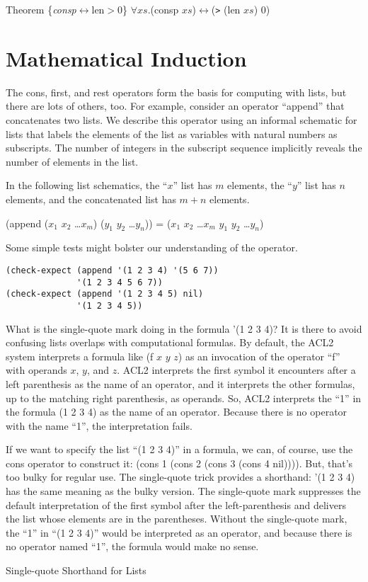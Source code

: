 \label{consp-len-thm}
Theorem \{\emph{consp}$\leftrightarrow$len$>$0\} $\forall xs.$(consp $xs$)$\leftrightarrow$(\verb+>+ (len $xs$) 0)

\section{Mathematical Induction}
\label{sec:induction}
The cons, first, and rest operators form the basis for computing with lists, but there are lots of others, too. For example, consider an operator ``append'' that concatenates two lists. We describe this operator using an informal schematic for lists that labels the elements of the list as variables with natural numbers as subscripts. The number of integers in the subscript sequence implicitly reveals the number of elements in the list.

\label{list-schematic} In the following list schematics, the ``$x$'' list has $m$ elements, the ``$y$'' list has $n$ elements, and the concatenated list has $m+n$ elements.
\begin{center}
(append ($x_1$ $x_2$ \dots $x_m$) ($y_1$ $y_2$ \dots $y_n$)) = ($x_1$ $x_2$ \dots $x_m$ $y_1$ $y_2$ \dots $y_n$)
\end{center}

Some simple tests might bolster our understanding of the operator.

\begin{lstlisting}
(check-expect (append '(1 2 3 4) '(5 6 7))
              '(1 2 3 4 5 6 7))
(check-expect (append '(1 2 3 4 5) nil)
              '(1 2 3 4 5))
\end{lstlisting}

\begin{aside}
What is the single-quote mark doing in the formula '(1 2 3 4)? It is there to avoid confusing lists overlaps with computational formulas. By default, the ACL2 system interprets a formula like (f $x$ $y$ $z$) as an invocation of the operator ``f'' with operands $x$, $y$, and $z$. ACL2 interprets the first symbol it encounters after a left parenthesis as the name of an operator, and it interprets the other formulas, up to the matching right parenthesis, as operands.
So, ACL2 interprets the ``1'' in the formula (1 2 3 4) as the name of an operator.
Because there is no operator with the name ``1'', the interpretation fails.

If we want to specify the list ``(1 2 3 4)'' in a formula, we can, of course, use the cons operator to construct it: (cons 1 (cons 2 (cons 3 (cons 4 nil)))). But, that's too bulky for regular use. The single-quote trick provides a shorthand: '(1 2 3 4) has the same meaning as the bulky version. The single-quote mark suppresses the default interpretation of the first symbol after the left-parenthesis and delivers the list whose elements are in the parentheses. Without the single-quote mark, the ``1'' in ``(1 2 3 4)'' would be interpreted as an operator, and because there is no operator named ``1'', the formula would make no sense.
\caption{Single-quote Shorthand for Lists}
\label{quote}
\end{aside}

